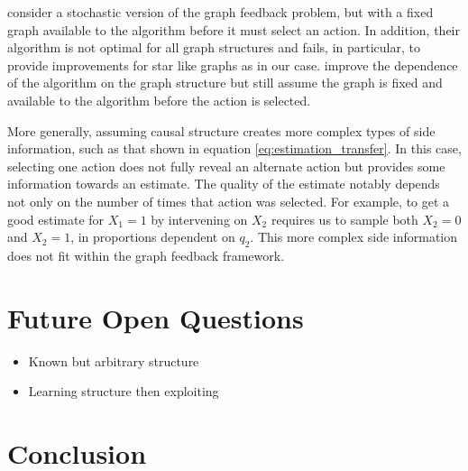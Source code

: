 \documentclass{article}
\theoremstyle{plain}
\theoremstyle{definition}
\begin{document}
\cite{Lelarge2012} consider a stochastic version of the graph feedback problem, but with a fixed graph available to the algorithm before it must select an action. In addition, their algorithm is not optimal for all graph structures and fails, in particular, to provide improvements for star like graphs as in our case. \cite{Buccapatnam2014} improve the dependence of the algorithm on the graph structure but still assume the graph is fixed and available to the algorithm before the action is selected. 

More generally, assuming causal structure creates more complex types of side information, such as that shown in equation \ref{eq:estimation_transfer}. In this case, selecting one action does not fully reveal an alternate action but provides some information towards an estimate. The quality of the estimate notably depends not only on the number of times that action was selected. For example, to get a good estimate for $X_1 = 1$ by intervening on $X_2$ requires us to sample both $X_2=0$ and $X_2=1$, in proportions dependent on $q_2$. This more complex side information does not fit within the graph feedback framework.


\section{Future Open Questions}
\begin{itemize}
\item Known but arbitrary structure
\item Learning structure then exploiting
\end{itemize}
\section{Conclusion}
\end{document}
